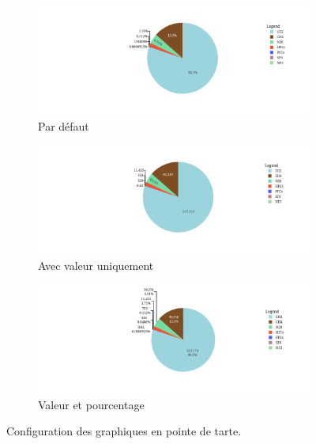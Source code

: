 \documentclass[11pt]{article}
\begin{document}
\begin{figure}[h]
    \centering
    \begin{subfigure}{0.49\textwidth}
        \includegraphics[width=\textwidth]{assets/fig5.2.png}
        \caption{Par défaut}
        \label{fig:firstpie}
    \end{subfigure}
    \hfill
    \begin{subfigure}{0.49\textwidth}
        \includegraphics[width=\textwidth]{assets/fig5.2-value.png}
        \caption{Avec valeur uniquement}
        \label{fig:secondpie}
    \end{subfigure}
    \hfill
    \begin{subfigure}{0.5\textwidth}
        \includegraphics[width=\textwidth]{assets/fig5.2-valuePercent.png}
        \caption{Valeur et pourcentage}
        \label{fig:thirdpie}
    \end{subfigure}
            
    \caption{Configuration des graphiques en pointe de tarte.}
    \label{fig:piechart}
    \end{figure}
\end{document}
